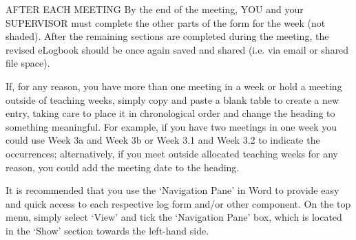 \documentclass[../CHEFCookingHelperForEveryonesFridge.tex]{subfiles}
\begin{document}
AFTER EACH MEETING
By the end of the meeting, YOU and your SUPERVISOR must complete the other parts of the form for the week (not shaded). After the remaining sections are completed during the meeting, the revised eLogbook should be once again saved and shared (i.e. via email or shared file space).

If, for any reason, you have more than one meeting in a week or hold a meeting outside of teaching weeks, simply copy and paste a blank table to create a new entry, taking care to place it in chronological order and change the heading to something meaningful. For example, if you have two meetings in one week you could use Week 3a and Week 3b or Week 3.1 and Week 3.2 to indicate the occurrences; alternatively, if you meet outside allocated teaching weeks for any reason, you could add the meeting date to the heading.

It is recommended that you use the ‘Navigation Pane’ in Word to provide easy and quick access to each respective log form and/or other component.  On the top menu, simply select ‘View’ and tick the ‘Navigation Pane’ box, which is located in the ‘Show’ section towards the left-hand side. 




\end{document}
